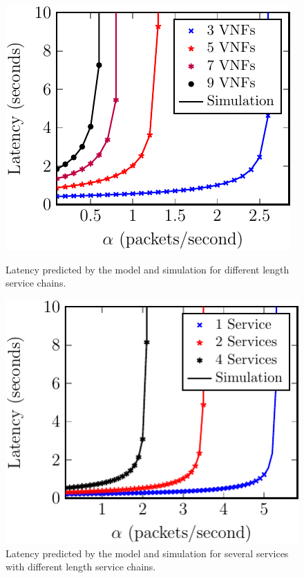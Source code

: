 \begin{figure}
\vspace{4mm}

\begin{minipage}[b]{.49\textwidth}
	\includegraphics[width=\linewidth]{graphs/diff_lengths-crop}
	\caption{Latency predicted by the model and simulation for different length
service chains.}
	\label{fig:length_chain}
\end{minipage}
\hfill
\begin{minipage}[b]{.49\textwidth}
	\includegraphics[width=\linewidth]{graphs/mult_services-crop}
	\caption{Latency predicted by the model and simulation for several services
with different length service chains.}
	\label{fig:mult_services}
\end{minipage}

\end{figure}

